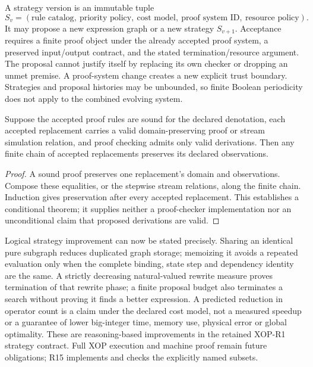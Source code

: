 A strategy version is an immutable tuple
\[
 S_v=(\text{rule catalog},\ \text{priority policy},\ \text{cost model},
       \ \text{proof system ID},\ \text{resource policy}).
\]
It may propose a new expression graph or a new strategy $S_{v+1}$. Acceptance
requires a finite proof object under the already accepted proof system, a
preserved input/output contract, and the stated termination/resource argument.
The proposal cannot justify itself by replacing its own checker or dropping an
unmet premise. A proof-system change creates a new explicit trust boundary.
Strategies and proposal histories may be unbounded, so finite Boolean
periodicity does not apply to the combined evolving system.

\begin{proposition}
Suppose the accepted proof rules are sound for the declared denotation, each
accepted replacement carries a valid domain-preserving proof or stream
simulation relation, and proof checking admits only valid derivations. Then any
finite chain of accepted replacements preserves its declared observations.
\end{proposition}
\begin{proof}
A sound proof preserves one replacement's domain and observations. Compose
these equalities, or the stepwise stream relations, along the finite chain.
Induction gives preservation after every accepted replacement. This establishes
a conditional theorem; it supplies neither a proof-checker implementation nor
an unconditional claim that proposed derivations are valid.
\end{proof}

Logical strategy improvement can now be stated precisely. Sharing an identical
pure subgraph reduces duplicated graph storage; memoizing it avoids a repeated
evaluation only when the complete binding, state step and dependency identity
are the same. A strictly decreasing natural-valued rewrite measure proves
termination of that rewrite phase; a finite proposal budget also terminates a
search without proving it finds a better expression. A predicted reduction in
operator count is a claim under the declared cost model, not a measured speedup
or a guarantee of lower big-integer time, memory use, physical error or global
optimality. These are reasoning-based improvements in the retained XOP-R1 strategy
contract. Full XOP execution and machine proof remain future obligations;
R15 implements and checks the explicitly named subsets.
